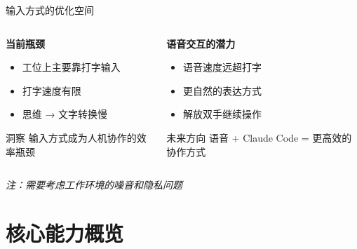 \documentclass[aspectratio=169,xcolor=dvipsnames]{beamer}
\begin{document}
\begin{frame}{输入方式的优化空间}
  \begin{columns}
    \begin{column}{0.48\textwidth}
      \textbf{当前瓶颈}
      \begin{itemize}
        \item 工位上主要靠打字输入
        \item 打字速度有限
        \item 思维 → 文字转换慢
      \end{itemize}

      \vspace{0.5cm}

      \begin{alertblock}{洞察}
        输入方式成为人机协作的效率瓶颈
      \end{alertblock}
    \end{column}
    \begin{column}{0.48\textwidth}
      \textbf{语音交互的潜力}
      \begin{itemize}
        \item 语音速度远超打字
        \item 更自然的表达方式
        \item 解放双手继续操作
      \end{itemize}

      \vspace{0.5cm}

      \begin{exampleblock}{未来方向}
        语音 + Claude Code = 更高效的协作方式
      \end{exampleblock}
    \end{column}
  \end{columns}

  \vspace{0.3cm}

  \small
  \textit{注：需要考虑工作环境的噪音和隐私问题}
\end{frame}

\section{核心能力概览}
\end{document}
